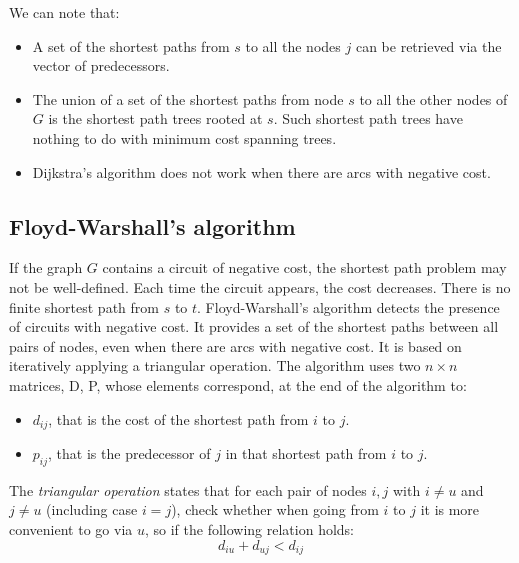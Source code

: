 \documentclass[12pt, a4paper]{report}
\begin{document}
    We can note that: 
    \begin{itemize}
        \item A set of the shortest paths from $s$ to all the nodes $j$ can be retrieved via the vector of predecessors. 
        \item The union of a set of the shortest paths from node $s$ to all the other nodes of $G$ is the shortest path trees rooted at $s$. Such shortest path trees have 
            nothing to do with minimum cost spanning trees. 
        \item Dijkstra's algorithm does not work when there are arcs with negative cost. 
    \end{itemize}

    \subsection{Floyd-Warshall's algorithm}
    If the graph $G$ contains a circuit of negative cost, the shortest path problem may not be well-defined. Each time the circuit appears, the cost decreases. There is no 
    finite shortest path from $s$ to $t$. Floyd-Warshall's algorithm detects the presence of circuits with negative cost. It provides a set of the shortest paths between all pairs
    of nodes, even when there are arcs with negative cost. It is based on iteratively applying a triangular operation. 
    The algorithm uses two $n \times n$ matrices, D, P, whose elements correspond, at the end of the algorithm to: 
    \begin{itemize}
        \item $d_{ij}$, that is the cost of the shortest path from $i$ to $j$.
        \item $p_{ij}$, that is the predecessor of $j$ in that shortest path from $i$ to $j$.
    \end{itemize}
    \begin{definition}
        The \emph{triangular operation} states that for each pair of nodes $i,j$ with $i \neq u$ and $j \neq u$ (including case $i=j$), check whether when going from $i$ to $j$ it is 
        more convenient to go via $u$, so if the following relation holds: 
        \[d_{iu}+d_{uj} < d_{ij}\]
    \end{definition}
\end{document}

